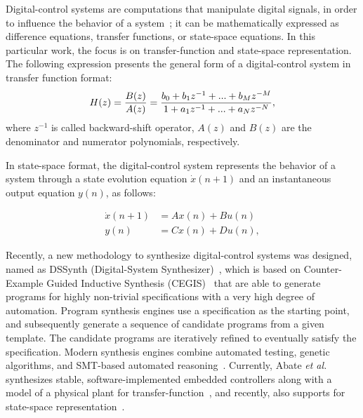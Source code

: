 \documentclass[sigconf]{acmart}
\begin{document}
Digital-control systems are computations that manipulate digital signals, in order to influence the behavior of a system~\cite{Ogata2001}; it can be mathematically expressed as difference equations, transfer functions, or state-space equations. In this particular work, the focus is on transfer-function and state-space representation. The following expression presents the general form of a digital-control system in transfer function format:
%
\begin{equation}
\small
\label{eq:transferfunction}
H(z)=\frac{B(z)}{A(z)}=\frac{b_{0}+b_{1}z^{-1}+...+b_{M}z^{-M}}{1+a_{1}z^{-1}+...+a_{N}z^{-N}},
\end{equation}
%
where $z^{-1}$ is called backward-shift operator, $A(z)$ and $B(z)$ are the denominator and numerator polynomials, respectively.

In state-space format, the digital-control system represents the behavior of a system through a state evolution equation $\dot{x}(n+1)$ and an instantaneous output equation $y(n)$, as follows:

\begin{equation}
\begin{split}
\dot{x}(n+1) &= A x(n) + B u(n)
\\
y(n) &= C x(n) + D u(n), 
\end{split}\label{eq:ss-example}
\end{equation}


Recently, a new methodology to synthesize digital-control systems was designed, named as DSSynth (Digital-System Synthesizer)~\cite{abate2017, abatecav2017}, which is based on Counter-Example Guided Inductive Synthesis (CEGIS)~\cite{DBLP:conf/asplos/Solar-LezamaTBSS06} that are able to generate programs for highly non-trivial specifications with a very high degree of automation. Program synthesis engines use a specification as the starting point, and subsequently generate a sequence of candidate programs from a given template. The candidate programs are iteratively refined to eventually satisfy the specification. Modern synthesis engines combine automated testing, genetic algorithms, and SMT-based automated reasoning~\cite{DBLP:journals/corr/AlurFSS16a, DBLP:conf/lpar/DavidKL15}. Currently, Abate {\it et al.}~\cite{abate2017} synthesizes stable, software-implemented embedded controllers along with a model of a physical plant for transfer-function~\cite{abate2017}, and recently, also supports for state-space representation~\cite{abatecav2017}.
\end{document}
